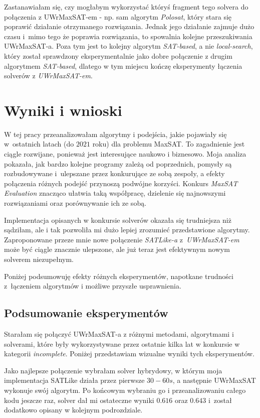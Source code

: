 \documentclass[shortabstract]{iithesis}
\begin{document}
Zastanawiałam się, czy mogłabym wykorzystać któryś fragment tego solvera do połączenia z UWrMaxSAT-em - np. sam algorytm \textit{Polosat}, który stara się poprawić działanie otrzymanego rozwiązania. Jednak jego działanie zajmuje dużo czasu i~mimo tego że poprawia rozwiązania, to spowalnia kolejne przeszukiwania UWrMaxSAT-a. Poza tym jest to kolejny algorytm \textit{SAT-based}, a nie \textit{local-search}, który został sprawdzony eksperymentalnie jako dobre połączenie z drugim algorytmem \textit{SAT-based}, dlatego w tym miejscu kończę eksperymenty łączenia solverów z \textit{UWrMaxSAT-em}.

\chapter{Wyniki i wnioski}
W tej pracy przeanalizowałam algorytmy i podejścia, jakie pojawiały się w~ostatnich latach (do $2021$ roku) dla problemu MaxSAT. To zagadnienie jest ciągle rozwijane, ponieważ jest interesujące naukowo i biznesowo. 
Moja analiza pokazała, jak bardzo kolejne programy zależą od poprzednich, pomysły są rozbudowywane i~ulepszane przez konkurujące ze sobą zespoły, a efekty połączenia różnych podejść przynoszą podwójne korzyści. Konkurs \textit{MaxSAT Evaluation} znacząco ułatwia taką współpracę, dzielenie się najnowszymi rozwiązaniami oraz porównywanie ich ze sobą.

Implementacja opisanych w konkursie solverów okazała się trudniejsza niż sądziłam, ale i tak pozwoliła mi dużo lepiej zrozumieć przedstawione algorytmy.
Zaproponowane przeze mnie nowe połączenie \textit{SATLike-a} z~\textit{UWrMaxSAT-em} może być ciągle znacznie ulepszone, ale już teraz jest efektywnym nowym solverem niezupełnym.

Poniżej podsumowuję efekty różnych eksperymentów, napotkane trudności z~łączeniem algorytmów i możliwe przyszłe usprawnienia. 
\section{Podsumowanie eksperymentów}
Starałam się połączyć UWrMaxSAT-a z różnymi metodami, algorytmami i solverami, które były wykorzystywane przez ostatnie kilka lat w konkursie w kategorii \textit{incomplete}. Poniżej przedstawiam wizualne wyniki tych eksperymentów.

Jako najlepsze połączenie wybrałam solver hybrydowy, w którym moja implementacja SATLike działa przez pierwsze $30-60s$, a następnie UWrMaxSAT wykonuje swój algorytm. Po końcowym wybraniu go i przeanalizowaniu całego kodu jeszcze raz, solver dał mi ostateczne wyniki $0.616$ oraz $0.643$ i~został dodatkowo opisany w kolejnym podrozdziale.
\end{document}

